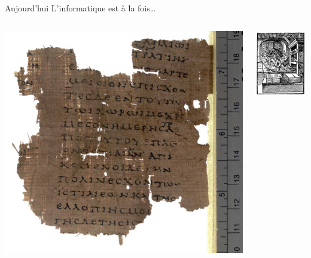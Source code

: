 \begin{frame}{Aujourd'hui}
\Large L'informatique est à la fois\ldots

\vfill

\begin{columns}
\begin{column}{0.33\linewidth}
\centering
\includegraphics[height=0.35\paperheight]{../resources/illustrations/histories-fragment} \\
\end{column}
\begin{column}{0.33\linewidth}
\centering
\includegraphics[height=0.35\paperheight]{../resources/illustrations/gutenberg} \\

\end{column}
\end{columns}
\end{frame}
